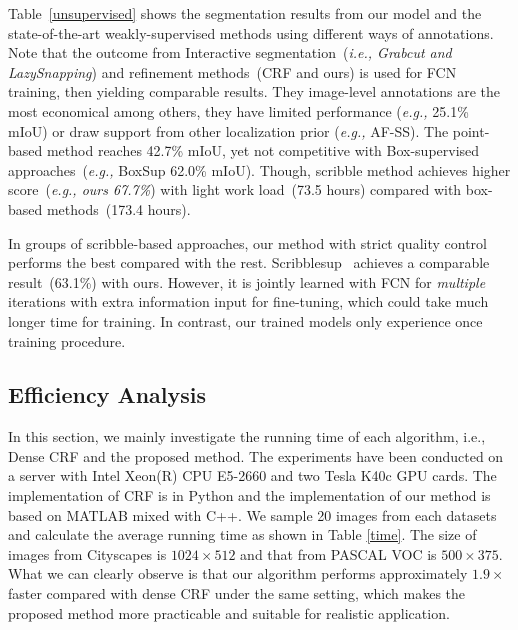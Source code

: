 \documentclass[sigconf]{acmart}
\begin{document}
Table~\ref{unsupervised} shows the segmentation results from our model and the state-of-the-art weakly-supervised methods using different ways of annotations. Note that the outcome from Interactive segmentation~(\textit{i.e., Grabcut and LazySnapping}) and refinement methods~(CRF and ours) is used for FCN training, then yielding comparable results. They image-level annotations are the most economical among others, they have limited performance (\textit{e.g.,} 25.1\% mIoU) or draw support from other localization prior (\textit{e.g.,} AF-SS). The point-based method reaches 42.7\% mIoU, yet not competitive with Box-supervised approaches~(\textit{e.g.,} BoxSup 62.0\% mIoU). Though, scribble method achieves higher score~(\textit{e.g., ours 67.7\%}) with light work load~(73.5 hours) compared with box-based methods~(173.4 hours).

In groups of scribble-based approaches, our method with strict quality control performs the best compared with the rest. Scribblesup~\cite{scribbleup} achieves a comparable result~(63.1\%) with ours. However, it is jointly learned with FCN for \emph{multiple} iterations with extra information input for fine-tuning, which could take much longer time for training. In contrast, our trained models only experience once training procedure.


\subsection{Efficiency Analysis}
In this section, we mainly investigate the running time of each algorithm, i.e., Dense CRF and the proposed method. The experiments have been conducted on a server with Intel Xeon(R) CPU E5-2660 and two Tesla K40c GPU cards. The implementation of CRF is in Python and the implementation of our method is based on MATLAB mixed with C++. We sample 20 images from each datasets and calculate the average running time as shown in Table \ref{time}. The size of images from Cityscapes is $1024\times512$ and that from PASCAL VOC is $500\times375$. What we can clearly observe is that our algorithm performs approximately $1.9\times$ faster compared with dense CRF under the same setting, which makes the proposed method more practicable and suitable for realistic application. 
\begin{table}[htb!]
	\centering
	\caption{Comparison on running time of dense CRF and the proposed method.}
	\label{time}
\end{table}
\end{document}

